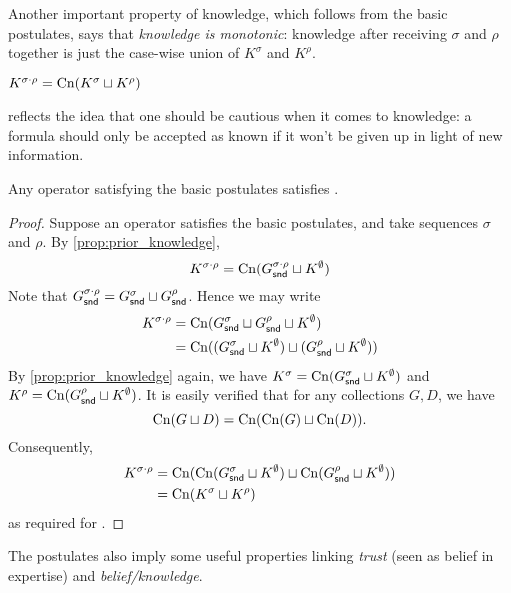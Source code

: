 Another important property of knowledge, which follows from the basic
postulates, says that \emph{knowledge is monotonic}: knowledge after receiving
$\sigma$ and $\rho$ together is just the case-wise union of $K^\sigma$ and
$K^\rho$.

\begin{postulate}[\kconj{}]
    $K^{\sigma \cdot \rho} = \operatorname{Cn}(K^\sigma \sqcup K^\rho)$
\end{postulate}

\kconj{} reflects the idea that one should be cautious when it comes to
knowledge: a formula should only be accepted as known if it won't be given up
in light of new information.

\begin{proposition}
    \label{prop:kconj}
    Any operator satisfying the basic postulates satisfies \kconj{}.
\end{proposition}

\begin{proof}
    Suppose an operator satisfies the basic postulates, and take sequences
    $\sigma$ and $\rho$. By \cref{prop:prior_knowledge},
    \[
        K^{\sigma \cdot \rho}
        =
        \operatorname{Cn}(G^{\sigma \cdot \rho}_{\mathsf{snd}} \sqcup K^\emptyset)
    \]
    Note that $G^{\sigma \cdot \rho}_{\mathsf{snd}} = G^\sigma_{\mathsf{snd}} \sqcup
    G^\rho_{\mathsf{snd}}$. Hence we may write
    \begin{align*}
        K^{\sigma \cdot \rho}
        &= \operatorname{Cn}(G^\sigma_{\mathsf{snd}} \sqcup G^\rho_{\mathsf{snd}} \sqcup K^\emptyset) \\
        &= \operatorname{Cn}((G^\sigma_{\mathsf{snd}} \sqcup K^\emptyset) \sqcup (G^\rho_{\mathsf{snd}} \sqcup K^\emptyset))
    \end{align*}
    By \cref{prop:prior_knowledge} again, we have $K^\sigma = \operatorname{Cn}(G^\sigma_{\mathsf{snd}}
    \sqcup K^\emptyset)$ and $K^\rho = \operatorname{Cn}(G^\rho_{\mathsf{snd}} \sqcup K^\emptyset)$. It
    is easily verified that for any collections $G, D$, we have
    \[
        \operatorname{Cn}(G \sqcup D) = \operatorname{Cn}(\operatorname{Cn}(G) \sqcup \operatorname{Cn}(D)).
    \]
    Consequently,
    \begin{align*}
        K^{\sigma \cdot \rho}
        &= \operatorname{Cn}(\operatorname{Cn}(G^\sigma_{\mathsf{snd}} \sqcup K^\emptyset) \sqcup \operatorname{Cn}(G^\rho_{\mathsf{snd}} \sqcup K^\emptyset)) \\
        &= \operatorname{Cn}(K^\sigma \sqcup K^\rho)
    \end{align*}
    as required for \kconj{}.
\end{proof}

The postulates also imply some useful properties linking \emph{trust} (seen as
belief in expertise) and \emph{belief/knowledge}.

